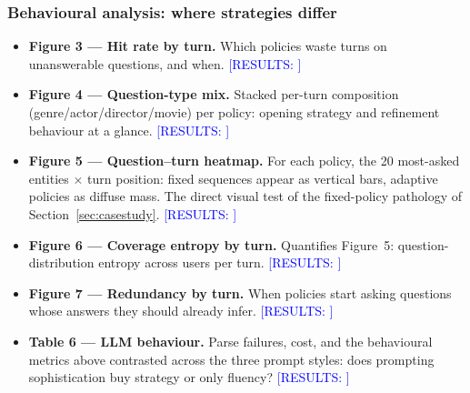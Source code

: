 \documentclass[11pt]{article}
\newcommand{\results}[1]{\textcolor{blue}{[RESULTS: #1]}}
\begin{document}
\subsubsection*{Behavioural analysis: where strategies differ}
\begin{itemize}
  \item \textbf{Figure 3 --- Hit rate by turn.} Which policies waste turns
  on unanswerable questions, and when. \results{}
  \item \textbf{Figure 4 --- Question-type mix.} Stacked per-turn
  composition (genre/actor/director/movie) per policy: opening strategy
  and refinement behaviour at a glance. \results{}
  \item \textbf{Figure 5 --- Question--turn heatmap.} For each policy, the
  20 most-asked entities $\times$ turn position: fixed sequences appear as
  vertical bars, adaptive policies as diffuse mass. The direct visual
  test of the fixed-policy pathology of Section~\ref{sec:casestudy}.
  \results{}
  \item \textbf{Figure 6 --- Coverage entropy by turn.} Quantifies
  Figure~5: question-distribution entropy across users per turn.
  \results{}
  \item \textbf{Figure 7 --- Redundancy by turn.} When policies start
  asking questions whose answers they should already infer. \results{}
  \item \textbf{Table 6 --- LLM behaviour.} Parse failures, cost, and the
  behavioural metrics above contrasted across the three prompt styles:
  does prompting sophistication buy strategy or only fluency? \results{}
\end{itemize}
\end{document}
